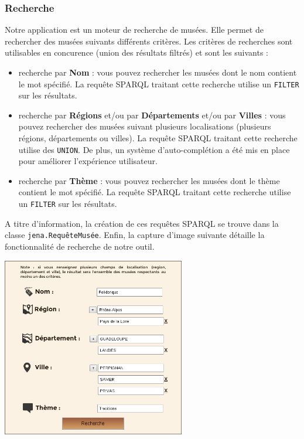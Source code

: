 \documentclass{article}
\begin{document}
\subsubsection{Recherche}

Notre application est un moteur de recherche de musées. Elle permet de
rechercher des musées suivants différents critères. Les critères de recherches
sont utilisables en concurence (union des résultats filtrés) et sont les
suivants :
\begin{itemize}
  \item recherche par \textbf{Nom} : vous pouvez rechercher les musées dont le
  nom contient le mot spécifié. La requête SPARQL traitant cette
  recherche utilise un \texttt{FILTER} sur les résultats.
  \item recherche par \textbf{Régions} et/ou par \textbf{Départements} et/ou par
  \textbf{Villes} :
  vous pouvez rechercher des musées suivant plusieurs localisations (plusieurs
  régions, départements ou villes). La requête SPARQL traitant cette recherche
  utilise des \texttt{UNION}. De plus, un système d'auto-complétion a été mis 
  en place pour améliorer l'expérience utilisateur.
  \item recherche par \textbf{Thème} : vous pouvez rechercher les musées dont le
  thème contient le mot spécifié. La requête SPARQL traitant cette
  recherche utilise un \texttt{FILTER} sur les résultats.
\end{itemize}
A titre d'information, la création de ces requêtes SPARQL se trouve dans la
classe \texttt{jena.RequêteMusée}. Enfin, la capture d'image suivante détaille
la fonctionnalité de recherche de notre outil.
\begin{center}
\includegraphics[width=8cm]{trouveMuseeRecherche.png}
\end{center}
\end{document}
